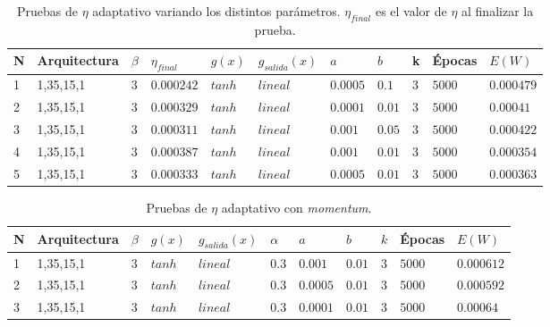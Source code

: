 \documentclass[11pt,a4paper]{article}
\begin{document}
{\begin{table}[ht]
\centering
\hspace*{-0.8cm}
\begin{tabular}{|l|l|l|l|l|l|l|l|l|l|l|}
\hline
N & Arquitectura & $\beta$ & $\eta_{final}$ & $g(x)$ & $g_{salida}(x)$ & $a$ & $b$ & k & Épocas & $E(W)$     \\ \hline
1 & 1,35,15,1    & $3$    & $0.000242$  & $tanh$ & $lineal$      & $0.0005$ & $0.1$  & $3$ & $5000$   & $0.000479$ \\ \hline
2 & 1,35,15,1    &  $3$    & $0.000329$  & $tanh$ & $lineal$      & $0.0001$ & $0.01$ & $3$ & $5000$   & $0.00041$  \\ \hline
3 & 1,35,15,1    &  $3$    & $0.000311$  & $tanh$ & $lineal$      & $0.001$  & $0.05$ & $3$ & $5000$   & $0.000422$ \\ \hline
4 & 1,35,15,1    &  $3$    & $0.000387$  & $tanh$ & $lineal$      & $0.001$  & $0.01$ & $3$ & $5000$   & $0.000354$ \\ \hline
5 & 1,35,15,1    &  $3$    & $0.000333$  & $tanh$ & $lineal$      & $0.0005$ & $0.01$ & $3$ & $5000$   & $0.000363$ \\ \hline
\end{tabular}
\caption{Pruebas de $\eta$ adaptativo variando los distintos parámetros. $\eta_{final}$ es el valor de $\eta$ al finalizar la prueba.}
\label{table:pruebaEtaAdapt}
\end{table}

\begin{table}[ht]
\centering
\begin{tabular}{|l|l|l|l|l|l|l|l|l|l|l|}
\hline
N & Arquitectura & $\beta$ & $g(x)$ & $g_{salida}(x)$ & $\alpha$ & $a$ & $b$ & $k$ & Épocas & $E(W)$    \\ \hline
1 & 1,35,15,1    & $3$    & $tanh$ & $lineal$      & $0.3$   & $0.001$  & $0.01$ & $3$ & $5000$   & $0.000612$ \\ \hline
2 & 1,35,15,1    & $3$    & $tanh$ & $lineal$      & $0.3$   & $0.0005$ & $0.01$ & $3$ & $5000$   & $0.000592$ \\ \hline
3 & 1,35,15,1    & $3$    & $tanh$ & $lineal$      & $0.3$   & $0.0001$ & $0.01$ & $3$ & $5000$   & $0.00064$ \\ \hline
\end{tabular}
\caption{Pruebas de $\eta$ adaptativo con \emph{momentum}.}
\label{table:pruebaComb}
\end{table}

}
\end{document}
